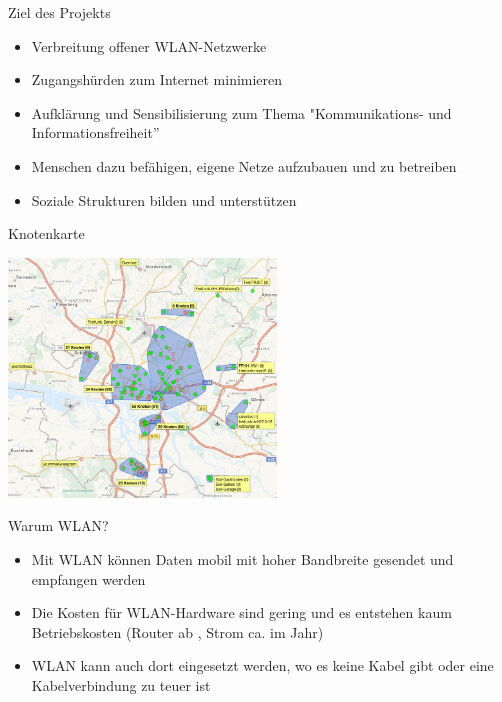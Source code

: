 \documentclass[c]{beamer}
\begin{document}
\begin{frame}{Ziel des Projekts}
	\begin{itemize}
		\item Verbreitung offener WLAN-Netzwerke
		\item Zugangshürden zum Internet minimieren
		\item Aufklärung und Sensibilisierung zum Thema "Kommunikations- und Informationsfreiheit''
		\item Menschen dazu befähigen, eigene Netze aufzubauen und zu betreiben
		\item Soziale Strukturen bilden und unterstützen
	\end{itemize}
\end{frame}



\begin{frame}{Knotenkarte}
	\begin{center}
		\includegraphics[height=180pt]{knotenkarte}
	\end{center}
\end{frame}



\begin{frame}{Warum WLAN?}
	\begin{itemize}
		\item Mit WLAN können Daten mobil mit hoher Bandbreite gesendet und empfangen werden
		\item Die Kosten für WLAN-Hardware sind gering und es entstehen kaum Betriebskosten (Router ab , Strom ca.  im Jahr)
		\item WLAN kann auch dort eingesetzt werden, wo es keine Kabel gibt oder eine Kabelverbindung zu teuer ist
	\end{itemize}
\end{frame}
\end{document}
